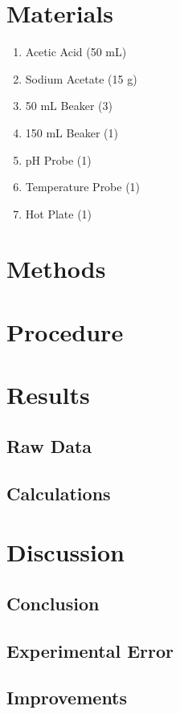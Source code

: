 \documentclass{article}
\begin{document}
\section*{Materials} %
\begin{enumerate}
\item Acetic Acid (50 mL)
\item Sodium Acetate (15 g)
\item 50 mL Beaker (3)
\item 150 mL Beaker (1)
\item pH Probe (1)
\item Temperature Probe (1)
\item Hot Plate (1)
\end{enumerate}
\section*{Methods}%

\section*{Procedure} %

\section*{Results} %
\subsection*{Raw Data} %

\subsection*{Calculations}%

\section*{Discussion}%
\subsection*{Conclusion}

\subsection*{Experimental Error} %

\subsection*{Improvements} %
\end{document}
